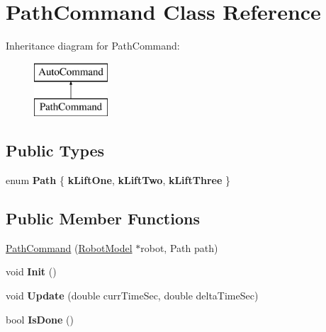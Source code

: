 \hypertarget{class_path_command}{}\section{Path\+Command Class Reference}
\label{class_path_command}
Inheritance diagram for Path\+Command\+:\begin{figure}[H]
\begin{center}
\leavevmode
\includegraphics[height=2.000000cm]{class_path_command}
\end{center}
\end{figure}
\subsection*{Public Types}
\begin{DoxyCompactItemize}
\item 
\mbox{\label{class_path_command_a16c9817753b2a9c1f171a6da90448424}} 
enum {\bfseries Path} \{ {\bfseries k\+Lift\+One}, 
{\bfseries k\+Lift\+Two}, 
{\bfseries k\+Lift\+Three}
 \}
\end{DoxyCompactItemize}
\subsection*{Public Member Functions}
\begin{DoxyCompactItemize}
\item 
\hyperlink{class_path_command_af13590c26630833220671975f3d2ffa9}{Path\+Command} (\hyperlink{class_robot_model}{Robot\+Model} $\ast$robot, Path path)
\item 
\mbox{\label{class_path_command_af6b08e736ddda29d989fe484e9fd7383}} 
void {\bfseries Init} ()
\item 
\mbox{\label{class_path_command_a64f5ebbbe897a3305bdd9905e7b088f4}} 
void {\bfseries Update} (double curr\+Time\+Sec, double delta\+Time\+Sec)
\item 
\mbox{\label{class_path_command_a29e919cef5f6ba460060c6252d2c2910}} 
bool {\bfseries Is\+Done} ()
\end{DoxyCompactItemize}
